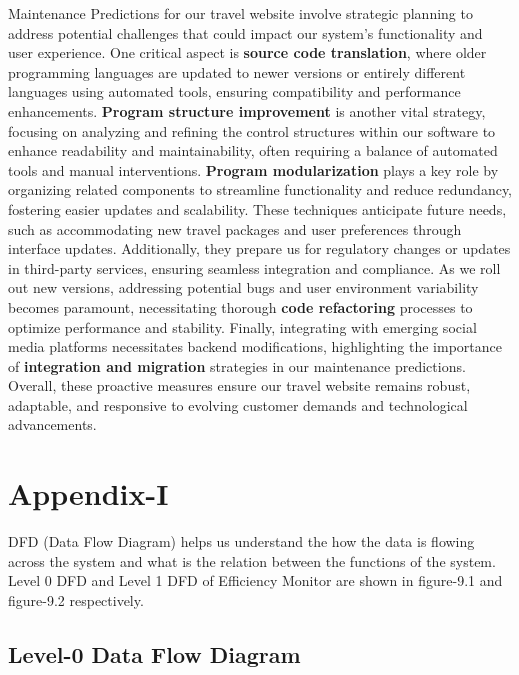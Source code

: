 \documentclass{scrreprt}
\begin{document}
Maintenance Predictions for our travel website involve strategic planning to address potential challenges that could impact our system's functionality and user experience. One critical aspect is \textbf{source code translation}, where older programming languages are updated to newer versions or entirely different languages using automated tools, ensuring compatibility and performance enhancements. \textbf{Program structure improvement} is another vital strategy, focusing on analyzing and refining the control structures within our software to enhance readability and maintainability, often requiring a balance of automated tools and manual interventions. \textbf{Program modularization} plays a key role by organizing related components to streamline functionality and reduce redundancy, fostering easier updates and scalability. These techniques anticipate future needs, such as accommodating new travel packages and user preferences through interface updates. Additionally, they prepare us for regulatory changes or updates in third-party services, ensuring seamless integration and compliance. As we roll out new versions, addressing potential bugs and user environment variability becomes paramount, necessitating thorough \textbf{code refactoring} processes to optimize performance and stability. Finally, integrating with emerging social media platforms necessitates backend modifications, highlighting the importance of \textbf{integration and migration} strategies in our maintenance predictions. Overall, these proactive measures ensure our travel website remains robust, adaptable, and responsive to evolving customer demands and technological advancements.

\chapter{Appendix-I}
DFD (Data Flow Diagram) helps us understand the how the data is flowing across the system and
what is the relation between the functions of the system.
Level 0 DFD and Level 1 DFD of Efficiency Monitor are shown in figure-9.1 and figure-9.2
respectively.

\section{Level-0 Data Flow Diagram}
\end{document}
